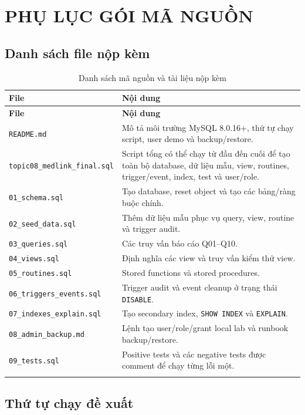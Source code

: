 \documentclass[12pt, a4paper, oneside, openany]{report}
\newcommand{\dbid}[1]{{\normalfont\ttfamily\footnotesize\nolinkurl{#1}}}
\begin{document}
\appendix
\chapter{PHỤ LỤC GÓI MÃ NGUỒN}

\section{Danh sách file nộp kèm}

\begin{longtable}{|L{5.2cm}|L{8.4cm}|}
\hline
\normalfont\normalsize\textbf{File} & \textbf{Nội dung} \\
\hline
\endfirsthead
\hline
\normalfont\normalsize\textbf{File} & \textbf{Nội dung} \\
\hline
\endhead
\dbid{README.md} & Mô tả môi trường MySQL 8.0.16+, thứ tự chạy script, user demo và backup/restore. \\
\hline
\dbid{topic08_medlink_final.sql} & Script tổng có thể chạy từ đầu đến cuối để tạo toàn bộ database, dữ liệu mẫu, view, routines, trigger/event, index, test và user/role. \\
\hline
\dbid{01_schema.sql} & Tạo database, reset object và tạo các bảng/ràng buộc chính. \\
\hline
\dbid{02_seed_data.sql} & Thêm dữ liệu mẫu phục vụ query, view, routine và trigger audit. \\
\hline
\dbid{03_queries.sql} & Các truy vấn báo cáo Q01--Q10. \\
\hline
\dbid{04_views.sql} & Định nghĩa các view và truy vấn kiểm thử view. \\
\hline
\dbid{05_routines.sql} & Stored functions và stored procedures. \\
\hline
\dbid{06_triggers_events.sql} & Trigger audit và event cleanup ở trạng thái \texttt{DISABLE}. \\
\hline
\dbid{07_indexes_explain.sql} & Tạo secondary index, \texttt{SHOW INDEX} và \texttt{EXPLAIN}. \\
\hline
\dbid{08_admin_backup.md} & Lệnh tạo user/role/grant local lab và runbook backup/restore. \\
\hline
\dbid{09_tests.sql} & Positive tests và các negative tests được comment để chạy từng lỗi một. \\
\hline
\caption{Danh sách mã nguồn và tài liệu nộp kèm}
\end{longtable}

\section{Thứ tự chạy đề xuất}
\end{document}
